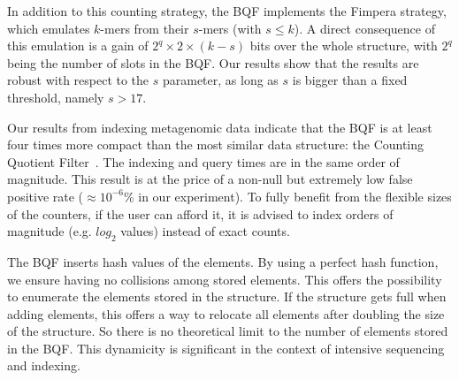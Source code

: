 In addition to this counting strategy, the BQF implements the Fimpera strategy, which emulates $k$-mers from their $s$-mers (with $s\leq k$).
A direct consequence of this emulation is a gain of $2^q \times 2 \times (k-s)$ bits over the whole structure, with $2^q$ being the number of slots in the BQF. Our results show that the results are robust with respect to the $s$ parameter, as long as $s$ is bigger than a fixed threshold, namely $s>17$.

Our results from indexing metagenomic data indicate that the BQF is at least four times more compact than the most similar data structure: the Counting Quotient Filter~\cite{counting_quotient_filter_2017}. The indexing and query times are in the same order of magnitude. This result is at the price of a non-null but extremely low false positive rate ($\approx 10^{-6}$\% in our experiment).
To fully benefit from the flexible sizes of the counters, if the user can afford it, it is advised to index orders of magnitude (e.g. $log_2$ values) instead of exact counts. 

The BQF inserts hash values of the elements. 
By using a perfect hash function, we ensure having no collisions among stored elements. This offers the possibility to enumerate the elements stored in the structure. If the structure gets full when adding elements, this offers a way to relocate all elements after doubling the size of the structure. So there is no theoretical limit to the number of elements stored in the BQF. This dynamicity is significant in the context of intensive sequencing and indexing. 



